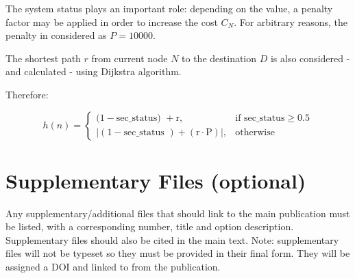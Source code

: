 \documentclass{article}
\theoremstyle{customdef}
\begin{document}
The system status plays an important role: depending on the value, a penalty factor may be applied in order to increase the cost $C_N$. For arbitrary reasons, the penalty in considered as $P = 10000$. 

The shortest path $r$ from current node $N$ to the destination $D$ is also considered - and calculated - using Dijkstra algorithm.

Therefore:

\[
h(n) =
\begin{cases}
(1 - \text{sec\_status) } + \text{r} , & \text{if  sec\_status} \geq 0.5 \\
|(1 - \text{sec\_status }) + (\text{r} \cdot \text{P})|, & \text{otherwise}
\end{cases}
\]




\section*{Supplementary Files (optional)}
Any supplementary/additional files that should link to the main publication must be listed, with a corresponding number, title and option description. Supplementary files should also be cited in the main text.
Note: supplementary files will not be typeset so they must be provided in their final form. They will be assigned a DOI and linked to from the publication.
\end{document}
